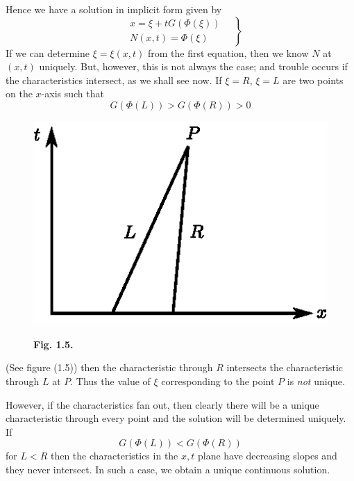 Hence we have a solution in implicit form given by 
\begin{equation*}
\left.
\begin{aligned}
& x = \xi + t G (\Phi (\xi)) \quad \\
& N (x,t) = \Phi (\xi)
\end{aligned}
\right\}\tag{1.10}\label{eq1.10}
\end{equation*}
If we can determine $\xi = \xi (x,t)$ from the first equation, then we know $N$ at $(x,t)$ uniquely. But, however, this is not always the case; and trouble occurs if the characteristics intersect, as we shall see now. If $\xi = R$, $\xi = L$ are two points on the $x$-axis such that 
$$
G(\Phi (L)) > G(\Phi (R)) > 0
$$
\begin{figure}[H]
\centering
\includegraphics{figures/fig1.5.eps}
\centerline{\bf Fig. 1.5.}
\end{figure}\pageoriginale 
(See figure (1.5)) then the characteristic through $R$ intersects the characteristic through $L$ at $P$. Thus the value of $\xi$ corresponding to the point $P$ is {\em not} unique.

However, if the characteristics fan out, then clearly there will be a unique characteristic through every point and the solution will be determined uniquely. If
\begin{equation*}
G(\Phi (L)) < G (\Phi (R)) \tag{1.11}\label{eq1.11}
\end{equation*}
for $L< R$ then the characteristics in the $x,t$ plane have decreasing slopes and they never intersect. In such  a case, we obtain a unique continuous solution.

